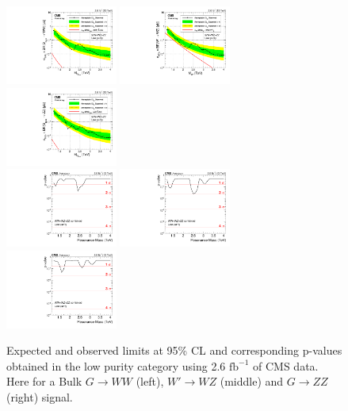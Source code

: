 \begin{figure}[h!]
\centering
\includegraphics[width=0.327\textwidth]{figures/analysis/search1/AN-15-211/limits/brazilianFlag_BulkWW_VVLP_new_combined_purity_13TeV_wPDF.pdf}
\includegraphics[width=0.327\textwidth]{figures/analysis/search1/AN-15-211/limits/brazilianFlag_WZ_VVLP_new_combined_purity_13TeV_wPDF.pdf}
\includegraphics[width=0.327\textwidth]{figures/analysis/search1/AN-15-211/limits/brazilianFlag_BulkZZ_VVLP_new_combined_purity_13TeV_wPDF.pdf}\\
\includegraphics[width=0.327\textwidth]{figures/analysis/search1/AN-15-211/pvalues/pvalue_BulkWWinVVnew_low_purity.pdf}
\includegraphics[width=0.327\textwidth]{figures/analysis/search1/AN-15-211/pvalues/pvalue_WZinVVnew_low_purity.pdf}
\includegraphics[width=0.327\textwidth]{figures/analysis/search1/AN-15-211/pvalues/pvalue_BulkZZinVVnew_low_purity.pdf}
\caption{Expected and observed limits at 95\% CL and corresponding p-values obtained in the low purity category using 2.6 $\textrm{fb}^{-1}$ of CMS data. Here for a Bulk $G\rightarrow WW$ (left), $W'\rightarrow WZ$ (middle) and $G\rightarrow ZZ$ (right) signal.}
\label{fig:app:Limits_LP}
\end{figure}
